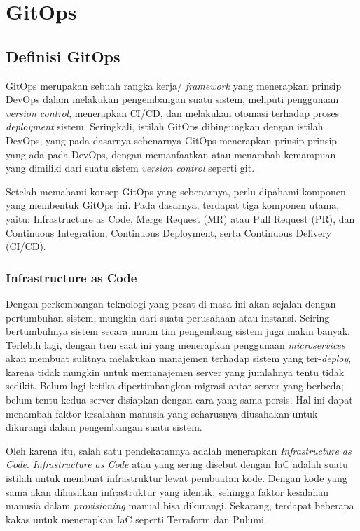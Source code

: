 \section{GitOps}

\subsection{Definisi GitOps}

GitOps merupakan sebuah rangka kerja/ \textit{framework} yang menerapkan prinsip DevOps dalam melakukan pengembangan suatu sistem, meliputi penggunaan \textit{version control}, menerapkan CI/CD, dan melakukan otomasi terhadap proses \textit{deployment} sistem\cite{gitlab}. Seringkali, istilah GitOps dibingungkan dengan istilah DevOps, yang pada dasarnya sebenarnya GitOps menerapkan prinsip-prinsip yang ada pada DevOps, dengan memanfaatkan atau menambah kemampuan yang dimiliki dari suatu sistem \textit{version control} seperti git.

Setelah memahami konsep GitOps yang sebenarnya, perlu dipahami komponen yang membentuk GitOps ini. Pada dasarnya, terdapat tiga komponen utama, yaitu: Infrastructure as Code, Merge Request (MR) atau Pull Request (PR), dan Continuous Integration, Continuous Deployment, serta Continuous Delivery (CI/CD).

\subsubsection{Infrastructure as Code}

Dengan perkembangan teknologi yang pesat di masa ini akan sejalan dengan pertumbuhan sistem, mungkin dari suatu perusahaan atau instansi. Seiring bertumbuhnya sistem secara umum tim pengembang sistem juga makin banyak. Terlebih lagi, dengan tren saat ini yang menerapkan penggunaan \textit{microservices} akan membuat sulitnya melakukan manajemen terhadap sistem yang ter-\textit{deploy}, karena tidak mungkin untuk memanajemen server yang jumlahnya tentu tidak sedikit. Belum lagi ketika dipertimbangkan migrasi antar server yang berbeda; belum tentu kedua server disiapkan dengan cara yang sama persis. Hal ini dapat menambah faktor kesalahan manusia yang seharusnya diusahakan untuk dikurangi dalam pengembangan suatu sistem.

Oleh karena itu, salah satu pendekatannya adalah menerapkan \textit{Infrastructure as Code}. \textit{Infrastructure as Code} atau yang sering disebut dengan IaC adalah suatu istilah untuk membuat infrastruktur lewat pembuatan kode. Dengan kode yang sama akan dihasilkan infrastruktur yang identik, sehingga faktor kesalahan manusia dalam \textit{provisioning} manual bisa dikurangi. Sekarang, terdapat beberapa kakas untuk menerapkan IaC seperti Terraform dan Pulumi. 

